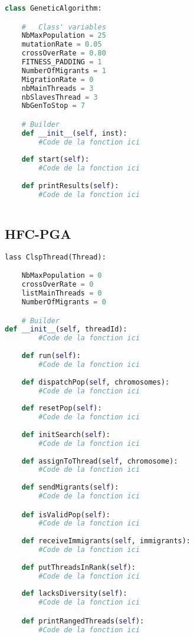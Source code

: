     \begin{lstlisting}[language=python]
class GeneticAlgorithm:

	#	Class' variables
	NbMaxPopulation = 25
	mutationRate = 0.05
	crossOverRate = 0.80
	FITNESS_PADDING = 1
	NumberOfMigrants = 1
	MigrationRate = 0 
	nbMainThreads = 3
	nbSlavesThread = 3
	NbGenToStop = 7

	# Builder
	def __init__(self, inst):
		#Code de la fonction ici
	
	def start(self):
		#Code de la fonction ici
	
	def printResults(self):
		#Code de la fonction ici
		
    \end{lstlisting}
	
	\subsection{HFC-PGA}	
	
	\begin{lstlisting}[language=python]
lass ClspThread(Thread):

	NbMaxPopulation = 0
	crossOverRate = 0
	listMainThreads = 0
	NumberOfMigrants = 0

	# Builder 
def __init__(self, threadId):
		#Code de la fonction ici	
	
	def run(self):
		#Code de la fonction ici	
	
	def dispatchPop(self, chromosomes):
		#Code de la fonction ici	
	
	def resetPop(self):
		#Code de la fonction ici	
	
	def initSearch(self):
		#Code de la fonction ici	
	
	def assignToThread(self, chromosome):	
		#Code de la fonction ici	
	
	def sendMigrants(self):
		#Code de la fonction ici	

	def isValidPop(self):	
		#Code de la fonction ici
	
	def receiveImmigrants(self, immigrants):
		#Code de la fonction ici	
	
	def putThreadsInRank(self):
		#Code de la fonction ici	
	
	def lacksDiversity(self):
		#Code de la fonction ici	

	def printRangedThreads(self):
		#Code de la fonction ici		
		
    \end{lstlisting}	
	
